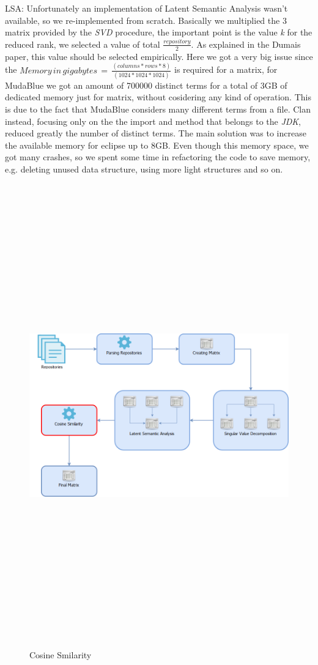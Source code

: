 LSA: Unfortunately an implementation of Latent Semantic Analysis wasn't available, so we re-implemented from scratch.
Basically we multiplied the 3 matrix provided by the \emph{SVD} procedure, the important point is the value \emph{k} for the reduced rank, we selected a value of total $\frac{repository}{2}$. As explained in the Dumais paper, this value should be selected empirically. 
Here we got a very big issue since the
$Memory\,in\,gigabytes\,=\,\frac{(columns*rows*8)}{(1024*1024*1024)}$ is required for a matrix, for MudaBlue we got an amount of 700000 distinct terms for a total of 3GB of dedicated memory just for matrix, without cosidering any kind of operation. This is due to the fact that MudaBlue considers many different terms from a file. Clan instead, focusing only on the the import and method that belongs to the \emph{JDK}, reduced greatly the number of distinct terms. The main solution was to increase the available memory for eclipse up to 8GB. Even though this memory space, we got many crashes, so we spent some time in refactoring the code to save memory, e.g. deleting unused data structure, using more light structures and so on.

\begin{figure}[H]
\includegraphics[width=15cm,height=20cm,keepaspectratio]{images/Architecture5.png}
\caption{Cosine Smilarity}
\end{figure}

